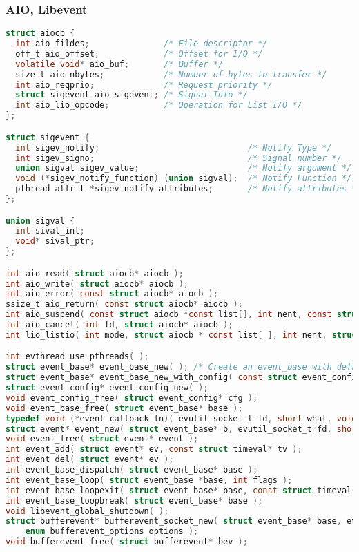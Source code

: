 \documentclass[legalpaper,10pt]{article}
\begin{document}
\subsubsection*{AIO, Libevent}
\begin{lstlisting}[language=C]
struct aiocb {
  int aio_fildes;               /* File descriptor */
  off_t aio_offset;             /* Offset for I/O */
  volatile void* aio_buf;       /* Buffer */
  size_t aio_nbytes;            /* Number of bytes to transfer */
  int aio_reqprio;              /* Request priority */
  struct sigevent aio_sigevent; /* Signal Info */
  int aio_lio_opcode;           /* Operation for List I/O */
};

struct sigevent {
  int sigev_notify;                              /* Notify Type */
  int sigev_signo;                               /* Signal number */
  union sigval sigev_value;                      /* Notify argument */
  void (*sigev_notify_function) (union sigval);  /* Notify Function */
  pthread_attr_t *sigev_notify_attributes;       /* Notify attributes */
};

union sigval {
  int sival_int;
  void* sival_ptr;
};

int aio_read( struct aiocb* aiocb );
int aio_write( struct aiocb* aiocb );
int aio_error( const struct aiocb* aiocb );
ssize_t aio_return( const struct aiocb* aiocb );
int aio_suspend( const struct aiocb *const list[], int nent, const struct timespec* timeout );
int aio_cancel( int fd, struct aiocb* aiocb );
int lio_listio( int mode, struct aiocb * const list[ ], int nent, struct sigevent* sigev );

int evthread_use_pthreads( );
struct event_base* event_base_new( ); /* Create an event_base with default settings */
struct event_base* event_base_new_with_config( const struct event_config* cfg ); /* Create with configuration */
struct event_config* event_config_new( );
void event_config_free( struct event_config* cfg );
void event_base_free( struct event_base* base );
typedef void (*event_callback_fn)( evutil_socket_t fd, short what, void* arg );
struct event* event_new( struct event_base* b, evutil_socket_t fd, short what, event_callback_fn cb, void* arg );
void event_free( struct event* event );
int event_add( struct event* ev, const struct timeval* tv );
int event_del( struct event* ev );
int event_base_dispatch( struct event_base* base );
int event_base_loop( struct event_base *base, int flags );
int event_base_loopexit( struct event_base* base, const struct timeval* tv );
int event_base_loopbreak( struct event_base* base );
void libevent_global_shutdown( );
struct bufferevent* bufferevent_socket_new( struct event_base* base, evutil_socket_t fd, 
    enum bufferevent_options options );
void bufferevent_free( struct bufferevent* bev );


\end{lstlisting}
\end{document}
